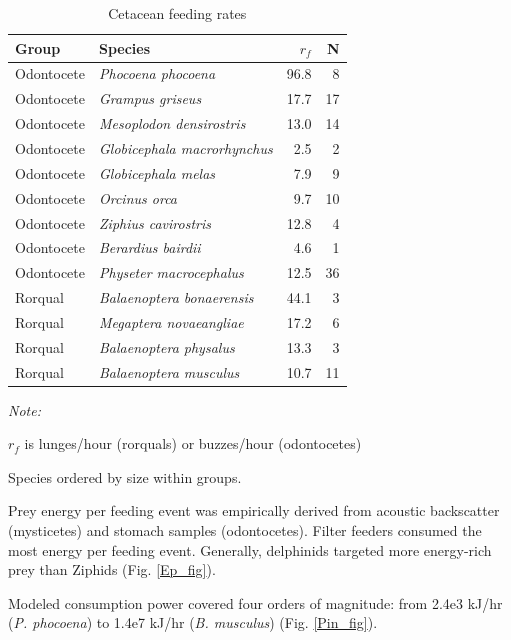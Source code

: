 \documentclass[]{elsarticle} %
\begin{document}
\begin{table}[t]

\caption{\label{tab:rf_tbl}Cetacean feeding rates \label{rf_tbl}}
\centering
\begin{threeparttable}
\begin{tabular}{llrr}
\toprule
Group & Species & $r_f$ & N\\
\midrule
Odontocete & \textit{Phocoena phocoena} & 96.8 & 8\\
Odontocete & \textit{Grampus griseus} & 17.7 & 17\\
Odontocete & \textit{Mesoplodon densirostris} & 13.0 & 14\\
Odontocete & \textit{Globicephala macrorhynchus} & 2.5 & 2\\
Odontocete & \textit{Globicephala melas} & 7.9 & 9\\
Odontocete & \textit{Orcinus orca} & 9.7 & 10\\
Odontocete & \textit{Ziphius cavirostris} & 12.8 & 4\\
Odontocete & \textit{Berardius bairdii} & 4.6 & 1\\
Odontocete & \textit{Physeter macrocephalus} & 12.5 & 36\\
Rorqual & \textit{Balaenoptera bonaerensis} & 44.1 & 3\\
Rorqual & \textit{Megaptera novaeangliae} & 17.2 & 6\\
Rorqual & \textit{Balaenoptera physalus} & 13.3 & 3\\
Rorqual & \textit{Balaenoptera musculus} & 10.7 & 11\\
\bottomrule
\end{tabular}
\begin{tablenotes}
\item \textit{Note: } 
\item $r_f$ is lunges/hour (rorquals) or buzzes/hour (odontocetes)
\item Species ordered by size within groups.
\end{tablenotes}
\end{threeparttable}
\end{table}

Prey energy per feeding event was empirically derived from acoustic
backscatter (mysticetes) and stomach samples (odontocetes). Filter
feeders consumed the most energy per feeding event. Generally,
delphinids targeted more energy-rich prey than Ziphids (Fig.
\ref{Ep_fig}).

Modeled consumption power covered four orders of magnitude: from 2.4e3
kJ/hr (\emph{P. phocoena}) to 1.4e7 kJ/hr (\emph{B. musculus}) (Fig.
\ref{Pin_fig}).
\end{document}
